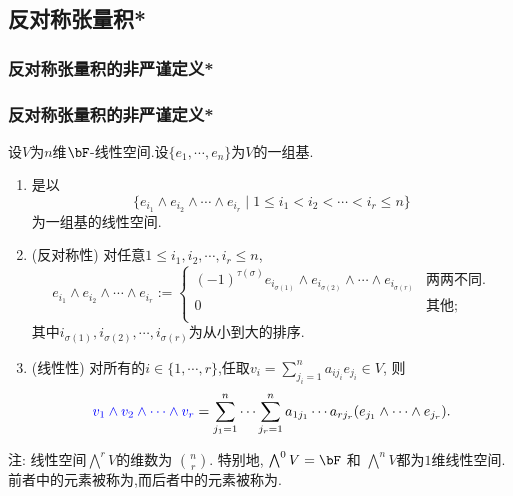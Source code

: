 \subsection{反对称张量积*}

\subsubsection{反对称张量积的非严谨定义*}
\begin{frame}\frametitle{反对称张量积的非严谨定义*}
\begin{proposition}[反对称张量积]
设$V$为$n$维$\bF$-线性空间.设$\{e_{1},\cdots,e_n\}$为$V$的一组基.
\begin{enumerate}
\item {} 是以
\[ \{e_{i_1}\wedge e_{i_2} \wedge \cdots \wedge e_{i_r} \mid 1\leq i_1< i_2< \cdots < i_r\leq n\}\]
为一组基的线性空间.
\item (反对称性) 对任意$1\leq i_1,i_2,\cdots,i_r\leq n$,
\begin{equation*}
e_{i_1}\wedge e_{i_2} \wedge \cdots \wedge e_{i_r}:=
\left\{
\begin{array}{ll}
(-1)^{\tau(\sigma)} e_{i_{\sigma(1)}}\wedge e_{i_{\sigma(2)}} \wedge\cdots\wedge e_{i_{\sigma(r)}}& \text{两两不同.}\\
0 & \text{其他};\\
\end{array}
\right.
\end{equation*}
其中$i_{\sigma(1)},i_{\sigma(2)},\cdots,i_{\sigma(r)}$为从小到大的排序.
\item (线性性) 对所有的$i\in \{1,\cdots,r\}$,任取$v_i=\sum_{j_i=1}^{n} a_{ij_i} e_{j_i}\in V$, 则
\[\blue{v_1\wedge v_2\wedge \cdots \wedge v_r} = \sum_{j_1=1}^{n} \cdots  \sum_{j_r=1}^{n} a_{1j_1} \cdots a_{rj_r} (e_{j_1}\wedge \cdots\wedge e_{j_r}).\]
\end{enumerate}
\end{proposition}

注: 线性空间$\bigwedge^rV$的维数为 ${n\choose r}$. 特别地, $\bigwedge^0 V= \bF$ 和 $\bigwedge^nV$都为$1$维线性空间. 前者中的元素被称为,而后者中的元素被称为.

\end{frame}






